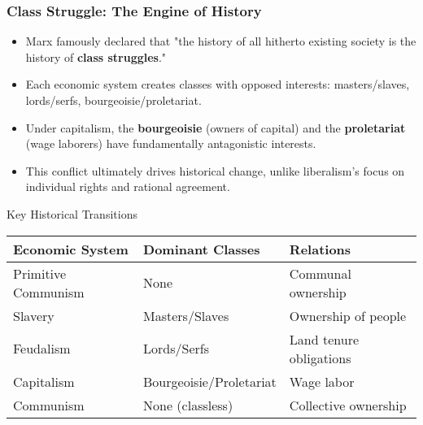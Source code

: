 \documentclass{beamer}
\begin{document}
\begin{frame}
\frametitle{Class Struggle: The Engine of History}
\begin{itemize}
    \item Marx famously declared that "the history of all hitherto existing society is the history of \textbf{class struggles}."
    \item Each economic system creates classes with opposed interests: masters/slaves, lords/serfs, bourgeoisie/proletariat.
    \item Under capitalism, the \textbf{bourgeoisie} (owners of capital) and the \textbf{proletariat} (wage laborers) have fundamentally antagonistic interests.
    \item This conflict ultimately drives historical change, unlike liberalism's focus on individual rights and rational agreement.
\end{itemize}

\begin{alertblock}{Key Historical Transitions}
\begin{tabular}{lll}
\textbf{Economic System} & \textbf{Dominant Classes} & \textbf{Relations} \\
\hline
Primitive Communism & None & Communal ownership \\
Slavery & Masters/Slaves & Ownership of people \\
Feudalism & Lords/Serfs & Land tenure obligations \\
Capitalism & Bourgeoisie/Proletariat & Wage labor \\
Communism & None (classless) & Collective ownership \\
\end{tabular}
\end{alertblock}
\end{frame}
\end{document}
